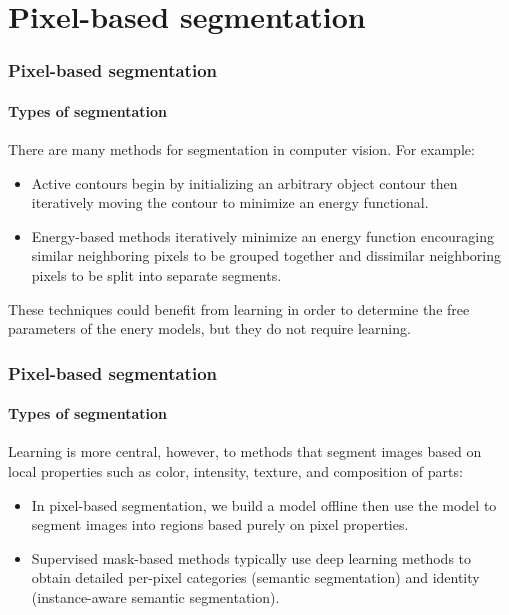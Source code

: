 \documentclass[aspectratio=169]{beamer}
\begin{document}
\section{Pixel-based segmentation}

\begin{frame}
\frametitle{Pixel-based segmentation}
\framesubtitle{Types of segmentation}

There are many methods for segmentation in computer vision.  For example:
\begin{itemize}
\item \alert{Active contours} begin by initializing an arbitrary
  object contour then iteratively moving the contour to minimize an
  energy functional.
\item \alert{Energy-based methods} iteratively minimize an energy function
  encouraging similar neighboring pixels to be grouped together and
  dissimilar neighboring pixels to be split into separate segments.
\end{itemize}

\medskip

These techniques could benefit from learning in order to determine the
free parameters of the enery models, but they \alert{do not require}
learning.

\end{frame}


\begin{frame}
\frametitle{Pixel-based segmentation}
\framesubtitle{Types of segmentation}

Learning is more central, however, to methods that
segment images based on \alert{local properties} such as
color, intensity, texture, and composition of parts:

\begin{itemize}
\item In \alert{pixel-based segmentation}, we build a model offline
  then use the model to segment images into regions based purely on
  pixel properties.
\item \alert{Supervised mask-based methods} typically use deep
  learning methods to obtain detailed per-pixel categories (semantic
  segmentation) and identity (instance-aware semantic segmentation).
\end{itemize}

\end{frame}
\end{document}
